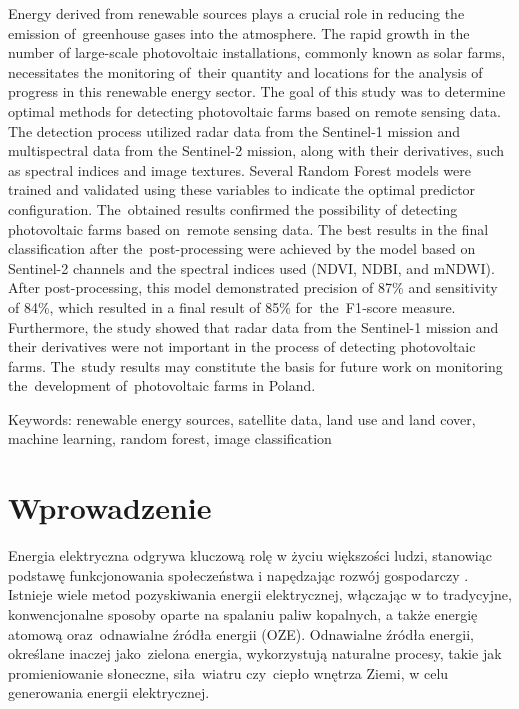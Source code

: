 \documentclass{amuthesis}
\begin{document}
Energy derived from renewable sources plays a crucial role in reducing
the emission of~greenhouse gases into the atmosphere. The rapid growth
in the number of large-scale photovoltaic installations, commonly known
as solar farms, necessitates the monitoring of~their quantity and
locations for the analysis of progress in this renewable energy sector.
The goal of this study was to determine optimal methods for detecting
photovoltaic farms based on remote sensing data. The detection process
utilized radar data from the Sentinel-1 mission and multispectral data
from the Sentinel-2 mission, along with their derivatives, such as
spectral indices and image textures. Several Random Forest models were
trained and validated using these variables to indicate the optimal
predictor configuration. The~obtained results confirmed the possibility
of detecting photovoltaic farms based on~remote sensing data. The best
results in the final classification after the~post-processing were
achieved by the model based on Sentinel-2 channels and the spectral
indices used (NDVI, NDBI, and mNDWI). After post-processing, this model
demonstrated precision of 87\% and sensitivity of 84\%, which resulted
in a final result of 85\% for~the~F1‑score measure. Furthermore, the
study showed that radar data from the Sentinel-1 mission and their
derivatives were not important in the process of detecting photovoltaic
farms. The~study results may constitute the basis for future work on
monitoring the~development of~photovoltaic farms in Poland.

Keywords: renewable energy sources, satellite data, land use and land
cover, machine learning, random forest, image classification

\newpage

\sf\tighttoc\doublespacing


\hypertarget{sec-wprowadzenie}{%
\chapter{Wprowadzenie}\label{sec-wprowadzenie}}

Energia elektryczna odgrywa kluczową rolę w życiu większości ludzi,
stanowiąc podstawę funkcjonowania społeczeństwa i napędzając rozwój
gospodarczy \autocite{iea2021}. Istnieje wiele metod pozyskiwania
energii elektrycznej, włączając w to tradycyjne, konwencjonalne sposoby
oparte na spalaniu paliw kopalnych, a także energię atomową
oraz~odnawialne źródła energii (OZE). Odnawialne źródła energii,
określane inaczej jako~zielona energia, wykorzystują naturalne procesy,
takie jak promieniowanie słoneczne, siła~wiatru czy~ciepło wnętrza
Ziemi, w celu generowania energii elektrycznej.
\end{document}
